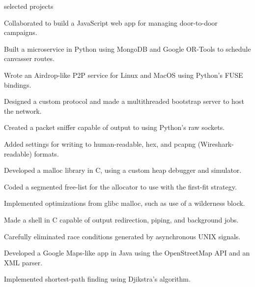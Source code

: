 \documentclass{cv}
\begin{document}
\begin{cvsection}{selected projects}
  {
    \item Collaborated to build a JavaScript web app for managing door-to-door campaigns.
    \item Built a microservice in Python using MongoDB and Google OR-Tools to schedule canvasser routes.
  }
  {
    \item Wrote an Airdrop-like P2P service for Linux and MacOS using Python's FUSE bindings.
    \item Designed a custom protocol and made a multithreaded bootstrap server to host the network.
  }
  {
    \item Created a packet sniffer capable of output to using Python's raw sockets.
    \item Added settings for writing to human-readable, hex, and pcapng (Wireshark-readable) formats.
  }
  {
    \item Developed a malloc library in C, using a custom heap debugger and simulator.
    \item Coded a segmented free-list for the allocator to use with the first-fit strategy.
    \item Implemented optimizations from glibc malloc, such as use of a wilderness block.
  }
  {
    \item Made a shell in C capable of output redirection, piping, and background jobs. 
    \item Carefully eliminated race conditions generated by asynchronous UNIX signals.
  }
  {
    \item Developed a Google Maps-like app in Java using the OpenStreetMap API and an XML parser.
    \item Implemented shortest-path finding using Djikstra's algorithm.
  }
\end{cvsection}
\end{document}

